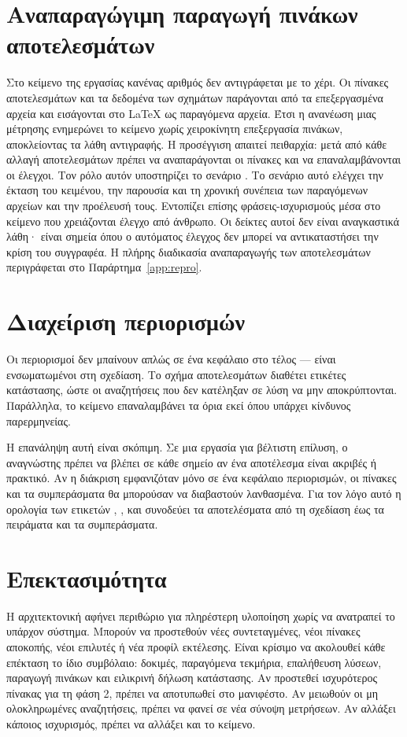 \section{Αναπαραγώγιμη παραγωγή πινάκων αποτελεσμάτων}
\label{sec:design-artifacts}
Στο κείμενο της εργασίας κανένας αριθμός δεν αντιγράφεται με το χέρι. Οι πίνακες αποτελεσμάτων και τα δεδομένα των σχημάτων παράγονται από τα επεξεργασμένα αρχεία και εισάγονται στο LaTeX ως παραγόμενα αρχεία. Έτσι η ανανέωση μιας μέτρησης ενημερώνει το κείμενο χωρίς χειροκίνητη επεξεργασία πινάκων, αποκλείοντας τα λάθη αντιγραφής. Η προσέγγιση απαιτεί πειθαρχία: μετά από κάθε αλλαγή αποτελεσμάτων πρέπει να αναπαράγονται οι πίνακες και να επαναλαμβάνονται οι έλεγχοι. Τον ρόλο αυτόν υποστηρίζει το σενάριο . Το σενάριο αυτό ελέγχει την έκταση του κειμένου, την παρουσία και τη χρονική συνέπεια των παραγόμενων αρχείων και την προέλευσή τους. Εντοπίζει επίσης φράσεις-ισχυρισμούς μέσα στο κείμενο που χρειάζονται έλεγχο από άνθρωπο. Οι δείκτες αυτοί δεν είναι αναγκαστικά λάθη· είναι σημεία όπου ο αυτόματος έλεγχος δεν μπορεί να αντικαταστήσει την κρίση του συγγραφέα. Η πλήρης διαδικασία αναπαραγωγής των αποτελεσμάτων περιγράφεται στο Παράρτημα~\ref{app:repro}.

\section{Διαχείριση περιορισμών}
\label{sec:design-limitations}
Οι περιορισμοί δεν μπαίνουν απλώς σε ένα κεφάλαιο στο τέλος — είναι ενσωματωμένοι στη σχεδίαση. Το σχήμα αποτελεσμάτων διαθέτει ετικέτες κατάστασης, ώστε οι αναζητήσεις που δεν κατέληξαν σε λύση να μην αποκρύπτονται. Παράλληλα, το κείμενο επαναλαμβάνει τα όρια εκεί όπου υπάρχει κίνδυνος παρερμηνείας.

Η επανάληψη αυτή είναι σκόπιμη. Σε μια εργασία για βέλτιστη επίλυση, ο αναγνώστης πρέπει να βλέπει σε κάθε σημείο αν ένα αποτέλεσμα είναι ακριβές ή πρακτικό. Αν η διάκριση εμφανιζόταν μόνο σε ένα κεφάλαιο περιορισμών, οι πίνακες και τα συμπεράσματα θα μπορούσαν να διαβαστούν λανθασμένα. Για τον λόγο αυτό η ορολογία των ετικετών , ,  και  συνοδεύει τα αποτελέσματα από τη σχεδίαση έως τα πειράματα και τα συμπεράσματα.

\section{Επεκτασιμότητα}
\label{sec:design-extensibility}
Η αρχιτεκτονική αφήνει περιθώριο για πληρέστερη υλοποίηση χωρίς να ανατραπεί το υπάρχον σύστημα. Μπορούν να προστεθούν νέες συντεταγμένες, νέοι πίνακες αποκοπής, νέοι επιλυτές ή νέα προφίλ εκτέλεσης. Είναι κρίσιμο να ακολουθεί κάθε επέκταση το ίδιο συμβόλαιο: δοκιμές, παραγόμενα τεκμήρια, επαλήθευση λύσεων, παραγωγή πινάκων και ειλικρινή δήλωση κατάστασης. Αν προστεθεί ισχυρότερος πίνακας για τη φάση 2, πρέπει να αποτυπωθεί στο μανιφέστο. Αν μειωθούν οι μη ολοκληρωμένες αναζητήσεις, πρέπει να φανεί σε νέα σύνοψη μετρήσεων. Αν αλλάξει κάποιος ισχυρισμός, πρέπει να αλλάξει και το κείμενο.

